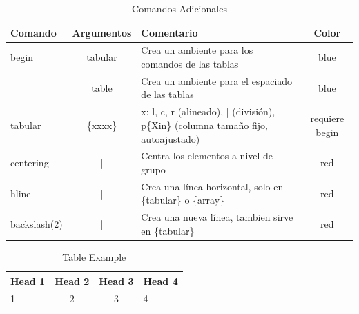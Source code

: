 \documentclass{article}
\begin{document}
	\begin{table}
		\centering
		\begin{tabular}{l|c|p{2in}|c}
			\hline
			Comando & Argumentos & Comentario & Color \\ \hline
			begin   & tabular & Crea un ambiente para los comandos de las tablas & blue \\
			        & table   & Crea un ambiente para el espaciado de las tablas  & blue \\ \hline
			tabular & \{xxxx\}  & x: l, c, r (alineado), | (división), p\{Xin\} (columna tamaño fijo, autoajustado) & requiere begin\\ \hline       
			centering & |     & Centra los elementos a nivel de grupo  & red \\ \hline
			hline   & |       & Crea una línea horizontal, solo en \{tabular\} o \{array\} & red \\ \hline
			backslash(2) & |  & Crea una nueva línea, tambien sirve en \{tabular\} & red \\
			\hline
		\end{tabular}	
		\caption{Comandos Adicionales}
	\end{table}
	
	
	\begin{table}
	\centering
		\begin{tabular}{|l|c|c|p{1in}|}
			\hline
			Head 1 & Head 2 & Head 3 & Head 4 \\ \hline
			1 & 2 & 3 & 4 \\
			\hline
		\end{tabular}	
	\caption{Table Example}\label{tab:first-table}
	\end{table}
	
	
\end{document}
